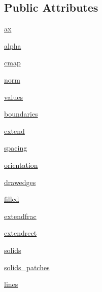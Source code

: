 \subsection*{Public Attributes}
\begin{DoxyCompactItemize}
\item 
\hyperlink{classmatplotlib_1_1colorbar_1_1ColorbarBase_a7c7242b00d002cd407d5068a8755afe2}{ax}
\item 
\hyperlink{classmatplotlib_1_1colorbar_1_1ColorbarBase_a1079da131721a9ca9b6241ad638e9b5a}{alpha}
\item 
\hyperlink{classmatplotlib_1_1colorbar_1_1ColorbarBase_a29c38d3fc56ca3a206de583c53823531}{cmap}
\item 
\hyperlink{classmatplotlib_1_1colorbar_1_1ColorbarBase_a3e823e99ebe4731a0b57c434db8d27e7}{norm}
\item 
\hyperlink{classmatplotlib_1_1colorbar_1_1ColorbarBase_a235aac27fe5881fd7cc1ba8fe9b8f9d4}{values}
\item 
\hyperlink{classmatplotlib_1_1colorbar_1_1ColorbarBase_ab4910522dfa4129aee92fb94a5c6e383}{boundaries}
\item 
\hyperlink{classmatplotlib_1_1colorbar_1_1ColorbarBase_a90a591d1dfc483e5a2f0cc0c0af8bab9}{extend}
\item 
\hyperlink{classmatplotlib_1_1colorbar_1_1ColorbarBase_a47e85d3cfa96f2e433b120f161f24e58}{spacing}
\item 
\hyperlink{classmatplotlib_1_1colorbar_1_1ColorbarBase_aeada0bef54f820328cc4f35f5166556c}{orientation}
\item 
\hyperlink{classmatplotlib_1_1colorbar_1_1ColorbarBase_a66d12baa5b73d267c8e3525d31906697}{drawedges}
\item 
\hyperlink{classmatplotlib_1_1colorbar_1_1ColorbarBase_ab81e23a7d5384a0dce5665d3276dcf51}{filled}
\item 
\hyperlink{classmatplotlib_1_1colorbar_1_1ColorbarBase_a8e16f5fb3405c95acb78af865414fac4}{extendfrac}
\item 
\hyperlink{classmatplotlib_1_1colorbar_1_1ColorbarBase_a81792a32b8d842c4ceda3c14889f6769}{extendrect}
\item 
\hyperlink{classmatplotlib_1_1colorbar_1_1ColorbarBase_acd48b30d3826cc6b2230ce7cde504a7e}{solids}
\item 
\hyperlink{classmatplotlib_1_1colorbar_1_1ColorbarBase_a507bde99cec8174c6fd0ddbdfffdd7c3}{solids\+\_\+patches}
\item 
\hyperlink{classmatplotlib_1_1colorbar_1_1ColorbarBase_aefd11e1bf925877deaa0288a1bc88873}{lines}

\end{DoxyCompactItemize}
